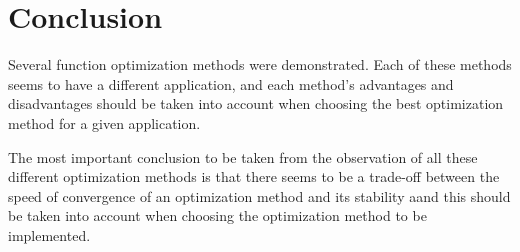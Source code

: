 \documentclass[journal]{IEEEtran}
\begin{document}
\section{Conclusion}

Several function optimization methods were demonstrated. Each of these methods seems to have a different application, and each method's advantages and disadvantages should be taken into account when choosing the best optimization method for a given application.

The most important conclusion to be taken from the observation of all these different optimization methods is that there seems to be a trade-off between the speed of convergence of an optimization method and its stability aand this should be taken into account when choosing the optimization method to be implemented.





\appendices





\end{document}
